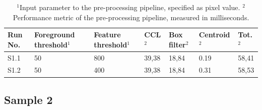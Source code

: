 \documentclass[12pt]{report}
\begin{document}
\begin{table}[!h]
    \centering
    \begin{tabular}{|p{0.8cm}|p{2.5cm}|p{2cm}||p{1.25cm}|p{1.25cm}|p{1.8cm}|p{1cm}|}
        \hline
        \textbf{Run No.}&\textbf{Foreground threshold$^{1}$}&\textbf{Feature threshold$^{1}$}&\textbf{CCL$^{2}$}&\textbf{Box filter$^{2}$}&\textbf{Centroid$^{2}$}&\textbf{Tot.$^{2}$}\\
        \hline
        \hline
        S1.1&50&800&39,38&18,84&0.19&58,41\\
        \hline
        S1.2&50&400&39,38&18,84&0.31&58,53\\
        \hline
    \end{tabular}
    \caption{$^{1}$Input parameter to the pre-processing pipeline, specified as pixel value. $^{2}$Performance metric of the pre-processing pipeline, measured in milliseconds. }
    \label{table:s0_res}
\end{table}

\subsection*{Sample 2}
\end{document}
